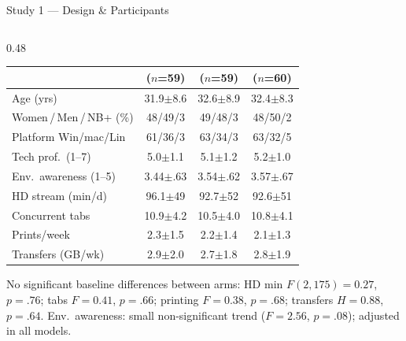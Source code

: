 \documentclass[10pt,aspectratio=169]{beamer}
\begin{document}
\begin{frame}{Study 1 --- Design \& Participants}
\begin{columns}[T]
\begin{column}{0.48\textwidth}
{\begin{table}
{\begin{tabular}{@{}lccc@{}}
& ($n$=59) & ($n$=59) & ($n$=60) \\
\midrule
Age (yrs) & 31.9\small{$\pm$8.6} & 32.6\small{$\pm$8.9} & 32.4\small{$\pm$8.3} \\
Women\,/\,Men\,/\,NB+ (\%) & 48/49/3 & 49/48/3 & 48/50/2 \\
Platform Win/mac/Lin & 61/36/3 & 63/34/3 & 63/32/5 \\
Tech prof.\ (1--7) & 5.0\small{$\pm$1.1} & 5.1\small{$\pm$1.2} & 5.2\small{$\pm$1.0} \\
Env.\ awareness (1--5) & 3.44\small{$\pm$.63} & 3.54\small{$\pm$.62} & 3.57\small{$\pm$.67} \\
\midrule
HD stream (min/d) & 96.1\small{$\pm$49} & 92.7\small{$\pm$52} & 92.6\small{$\pm$51} \\
Concurrent tabs & 10.9\small{$\pm$4.2} & 10.5\small{$\pm$4.0} & 10.8\small{$\pm$4.1} \\
Prints/week & 2.3\small{$\pm$1.5} & 2.2\small{$\pm$1.4} & 2.1\small{$\pm$1.3} \\
Transfers (GB/wk) & 2.9\small{$\pm$2.0} & 2.7\small{$\pm$1.8} & 2.8\small{$\pm$1.9} \\
\bottomrule
\end{tabular}
}
\end{table}
}
\vspace{2pt}
\begin{findingbox}
\scriptsize
No significant baseline differences between arms: HD min $F(2,175){=}0.27$, $p{=}.76$; tabs $F{=}0.41$, $p{=}.66$; printing $F{=}0.38$, $p{=}.68$; transfers $H{=}0.88$, $p{=}.64$. Env.\ awareness: small non-significant trend ($F{=}2.56$, $p{=}.08$); adjusted in all models.
\end{findingbox}
\end{column}
\end{columns}
\end{frame}

\end{document}
